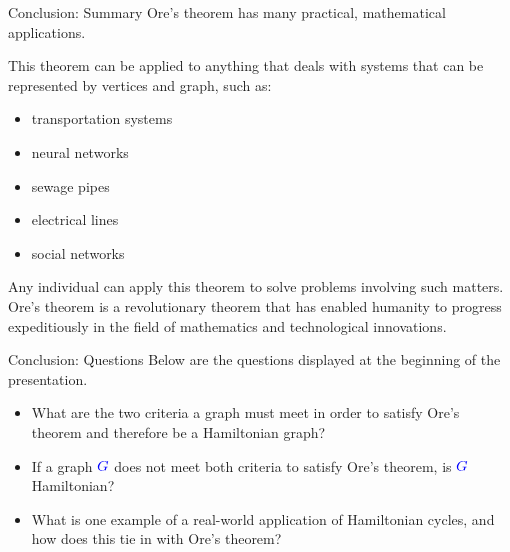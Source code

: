 \documentclass[pdf]{beamer}
\newcommand{\G}{\textcolor{blue}{G}}
\begin{document}
    \begin{frame}{Conclusion: Summary}
        Ore's theorem has many practical, mathematical applications.
        
        This theorem can be applied to anything that deals with systems that can be represented
        by vertices and graph, such as:
        \begin{multicols}{2}
            \begin{itemize}
            \item transportation systems
            \item neural networks
            \item sewage pipes
            \end{itemize}
            
            \columnbreak

            \begin{itemize}
            \item electrical lines
            \item social networks
            \end{itemize}
            \end{multicols}
            Any individual can apply this theorem to solve problems
            involving such matters. Ore's theorem is a revolutionary theorem that has
            enabled humanity to progress expeditiously in the field of mathematics and
            technological innovations.
    \end{frame}

    \begin{frame}{Conclusion: Questions}
        Below are the questions displayed at the beginning of the presentation.
        \vspace{10px}
        \begin{itemize}
            \item What are the two criteria a graph must meet in order to satisfy Ore's theorem and therefore be a Hamiltonian graph?
            \item If a graph $\G$ does not meet both criteria to satisfy Ore's theorem, is $\G$ Hamiltonian?
            \item What is one example of a real-world application of Hamiltonian cycles, and how does this tie in with Ore's theorem?
        \end{itemize}
    \end{frame}
\end{document}
